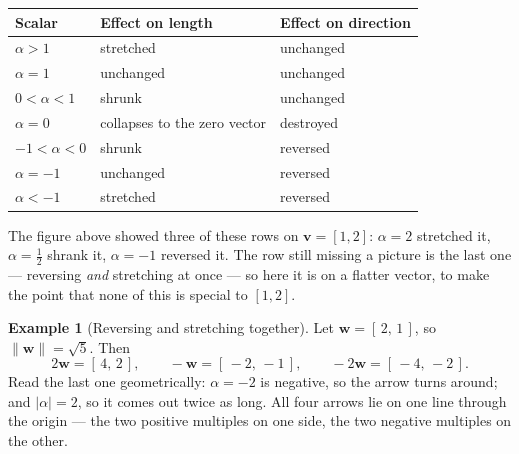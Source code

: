 \documentclass[11pt]{article}
\theoremstyle{definition}
\newtheorem{ex}{Example}[section]
\theoremstyle{remark}
\newcommand{\vc}[1]{\mathbf{#1}}
\newcommand{\norm}[1]{\lVert #1\rVert}
\newcommand{\lattice}[4]{%
  \draw[step=1cm,gray!25,very thin] (#1,#3) grid (#2,#4);
  \draw[axisline] (#1,0) -- (#2+0.45,0) node[right,font=\scriptsize,black]{$x$};
  \draw[axisline] (0,#3) -- (0,#4+0.45) node[above,font=\scriptsize,black]{$y$};
}
\begin{document}
\begin{center}
\renewcommand{\arraystretch}{1.25}
\begin{tabular}{@{}l l l@{}}
\toprule
\textbf{Scalar} & \textbf{Effect on length} & \textbf{Effect on direction} \\
\midrule
$\alpha>1$          & stretched                        & unchanged \\
$\alpha=1$          & unchanged                        & unchanged \\
$0<\alpha<1$        & shrunk                           & unchanged \\
$\alpha=0$          & collapses to the zero vector     & destroyed \\
$-1<\alpha<0$       & shrunk                           & reversed \\
$\alpha=-1$         & unchanged                        & reversed \\
$\alpha<-1$         & stretched                        & reversed \\
\bottomrule
\end{tabular}
\end{center}

\noindent The figure above showed three of these rows on $\vc{v}=[1,2]$:
$\alpha=2$ stretched it, $\alpha=\tfrac12$ shrank it, $\alpha=-1$ reversed it.
The row still missing a picture is the last one --- reversing \emph{and}
stretching at once --- so here it is on a flatter vector, to make the point that
none of this is special to $[1,2]$.

\begin{ex}[Reversing and stretching together]
Let $\vc{w}=[\,2,\,1\,]$, so $\norm{\vc{w}}=\sqrt5$. Then
\[
  2\vc{w}=[\,4,\,2\,],
  \qquad
  -\vc{w}=[\,-2,\,-1\,],
  \qquad
  -2\vc{w}=[\,-4,\,-2\,].
\]
Read the last one geometrically: $\alpha=-2$ is negative, so the arrow turns
around; and $\lvert\alpha\rvert=2$, so it comes out twice as long. All four
arrows lie on one line through the origin --- the two positive multiples on one
side, the two negative multiples on the other.
\end{ex}

\begin{center}
\end{center}
\end{document}

